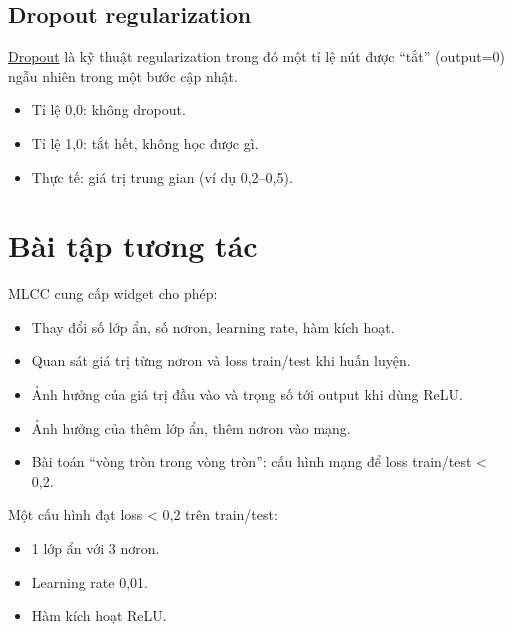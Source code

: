 \documentclass[12pt,a4paper]{article}
\begin{document}
\subsection{Dropout regularization}

\begin{dinhnghia}[title={Dropout}]
\href{https://developers.google.com/machine-learning/glossary\#dropout_regularization}{Dropout} là kỹ thuật regularization trong đó một tỉ lệ nút được ``tắt'' (output=0) ngẫu nhiên trong một bước cập nhật.
\begin{itemize}
  \item Tỉ lệ 0,0: không dropout.
  \item Tỉ lệ 1,0: tắt hết, không học được gì.
  \item Thực tế: giá trị trung gian (ví dụ 0,2--0,5).
\end{itemize}
\end{dinhnghia}

\section{Bài tập tương tác}

\begin{phuongphap}[title={Khám phá mạng nơron bằng widget}]
MLCC cung cấp widget cho phép:
\begin{itemize}
  \item Thay đổi số lớp ẩn, số nơron, learning rate, hàm kích hoạt.
  \item Quan sát giá trị từng nơron và loss train/test khi huấn luyện.
\end{itemize}
\end{phuongphap}

\begin{ynghia}[title={Các bài tập chính}]
\begin{itemize}
  \item Ảnh hưởng của giá trị đầu vào và trọng số tới output khi dùng ReLU.
  \item Ảnh hưởng của thêm lớp ẩn, thêm nơron vào mạng.
  \item Bài toán ``vòng tròn trong vòng tròn'': cấu hình mạng để loss train/test < 0,2.
\end{itemize}
\end{ynghia}

\begin{luuy}[title={Một cấu hình mẫu cho bài toán phi tuyến}]
Một cấu hình đạt loss < 0,2 trên train/test:
\begin{itemize}
  \item 1 lớp ẩn với 3 nơron.
  \item Learning rate 0,01.
  \item Hàm kích hoạt ReLU.
\end{itemize}
\end{luuy}
\end{document}
